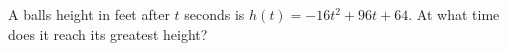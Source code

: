A ball\textquotesingle s height in feet after $t$ seconds is $h(t)=-16t^2+96t+64$. At what time does it reach its greatest height?
